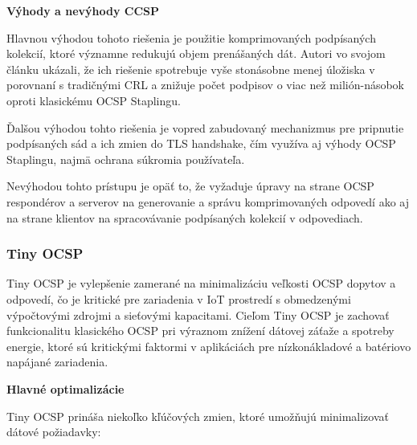\documentclass[12pt, twoside]{book}
\newcommand{\subsubsubsection}[1]{%
  \vspace{0.2em}  
  \textbf{#1} \\[0.2em]
  \hspace*{\parindent}
}
\begin{document}
\subsubsubsection{Výhody a nevýhody CCSP}
Hlavnou výhodou tohoto riešenia je použitie komprimovaných podpísaných kolekcií, ktoré významne redukujú objem prenášaných dát. Autori vo svojom článku ukázali, že     ich riešenie spotrebuje vyše stonásobne menej úložiska v porovnaní s tradičnými CRL a znižuje počet podpisov o viac než milión-násobok oproti klasickému OCSP Staplingu. \cite{ccsp}

Ďalšou výhodou tohto riešenia je vopred zabudovaný mechanizmus pre pripnutie podpísaných sád a ich zmien do TLS handshake, čím využíva aj výhody OCSP Staplingu, najmä ochrana súkromia používateľa.\cite{ccsp}

Nevýhodou tohto prístupu je opäť to, že vyžaduje úpravy na strane OCSP respondérov a serverov na generovanie a správu komprimovaných odpovedí ako aj na strane klientov na spracovávanie podpísaných kolekcií v odpovediach.

\subsubsection{Tiny OCSP}
Tiny OCSP je vylepšenie zamerané na minimalizáciu veľkosti OCSP dopytov a odpovedí, čo je kritické pre zariadenia v IoT prostredí s obmedzenými výpočtovými zdrojmi a sieťovými kapacitami. Cieľom Tiny OCSP je zachovať funkcionalitu klasického OCSP pri výraznom znížení dátovej záťaže a spotreby energie, ktoré sú kritickými faktormi v aplikáciách pre nízkonákladové a batériovo napájané zariadenia.\cite{tiny}

\newpage 
\subsubsubsection{Hlavné optimalizácie}
Tiny OCSP prináša niekoľko kľúčových zmien, ktoré umožňujú minimalizovať dátové požiadavky:
\end{document}
